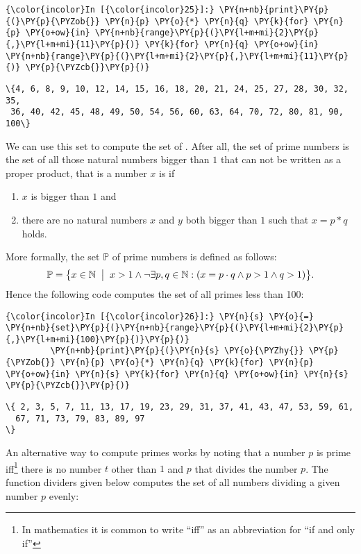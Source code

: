\begin{Verbatim}[commandchars=\\\{\}]
{\color{incolor}In [{\color{incolor}25}]:} \PY{n+nb}{print}\PY{p}{(}\PY{p}{\PYZob{}} \PY{n}{p} \PY{o}{*} \PY{n}{q} \PY{k}{for} \PY{n}{p} \PY{o+ow}{in} \PY{n+nb}{range}\PY{p}{(}\PY{l+m+mi}{2}\PY{p}{,}\PY{l+m+mi}{11}\PY{p}{)} \PY{k}{for} \PY{n}{q} \PY{o+ow}{in} \PY{n+nb}{range}\PY{p}{(}\PY{l+m+mi}{2}\PY{p}{,}\PY{l+m+mi}{11}\PY{p}{)} \PY{p}{\PYZcb{}}\PY{p}{)}
\end{Verbatim}

\begin{Verbatim}[commandchars=\\\{\}]
\{4, 6, 8, 9, 10, 12, 14, 15, 16, 18, 20, 21, 24, 25, 27, 28, 30, 32, 35,
 36, 40, 42, 45, 48, 49, 50, 54, 56, 60, 63, 64, 70, 72, 80, 81, 90, 100\}
\end{Verbatim}
We can use this set to compute the set of . 
After all, the set of prime numbers is the set of all those natural numbers
bigger than \(1\) that can not be written as a proper product, that is a
number \(x\) is  if

\begin{enumerate}
\item $x$ is bigger than $1$ and 
\item there are no natural numbers $x$ and $y$ both bigger than $1$ such that $x = p * q$ holds.
\end{enumerate}
More formally, the set \(\mathbb{P}\) of prime numbers is defined as
follows:
\[ \mathbb{P} = \bigl\{ x \in \mathbb{N} \;\bigm|\; x > 1 \wedge \neg \exists p, q \in \mathbb{N}: (x = p \cdot q \wedge p > 1 \wedge q > 1)\bigr\}. \]
Hence the following code computes the set of all primes less than 100:

\begin{Verbatim}[commandchars=\\\{\}]
{\color{incolor}In [{\color{incolor}26}]:} \PY{n}{s} \PY{o}{=} \PY{n+nb}{set}\PY{p}{(}\PY{n+nb}{range}\PY{p}{(}\PY{l+m+mi}{2}\PY{p}{,}\PY{l+m+mi}{100}\PY{p}{)}\PY{p}{)}
         \PY{n+nb}{print}\PY{p}{(}\PY{n}{s} \PY{o}{\PYZhy{}} \PY{p}{\PYZob{}} \PY{n}{p} \PY{o}{*} \PY{n}{q} \PY{k}{for} \PY{n}{p} \PY{o+ow}{in} \PY{n}{s} \PY{k}{for} \PY{n}{q} \PY{o+ow}{in} \PY{n}{s} \PY{p}{\PYZcb{}}\PY{p}{)}
\end{Verbatim}


\begin{Verbatim}[commandchars=\\\{\}]
\{ 2, 3, 5, 7, 11, 13, 17, 19, 23, 29, 31, 37, 41, 43, 47, 53, 59, 61,
  67, 71, 73, 79, 83, 89, 97
\}
\end{Verbatim}
An alternative way to compute primes works by noting that a number \(p\)
is prime iff\footnote{In mathematics it is common to write ``iff'' as an abbreviation for ``if and only if''}
there is no number \(t\) other than \(1\) and \(p\) that
divides the number \(p\). The function dividers given below computes the
set of all numbers dividing a given number \(p\) evenly:

